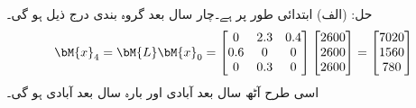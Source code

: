 حل: (الف) ابتدائی طور پر  ہے۔چار سال بعد گروہ بندی درج ذیل ہو گی۔
\begin{align*}
\bM{x}_4=\bM{L}\bM{x}_0=\begin{bmatrix} 0& 2.3&0.4\\0.6&0&0\\0&0.3&0 \end{bmatrix}\begin{bmatrix}2600\\2600\\2600  \end{bmatrix}=
\begin{bmatrix}7020\\1560\\780  \end{bmatrix}
\end{align*}
اسی طرح آٹھ سال بعد آبادی  اور بارہ سال بعد آبادی
  ہو گی۔


